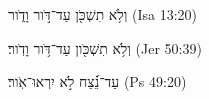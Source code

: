
\begin{exe}

\ex\label{antdur_begintoend_exs21}
\texthebrew{
וְלֹ֥א תִשְׁכֹּ֖ן עַד־דֹּ֣ור וָדֹ֑ור 
} (Isa 13:20)

\ex\label{antdur_begintoend_exs22}
\texthebrew{
וְלֹ֥א תִשְׁכֹּ֖ון עַד־דֹּ֥ור וָדֹֽור׃ 
} (Jer 50:39)

\ex\label{antdur_begintoend_exs23}
\texthebrew{
עַד־נֵ֝֗צַח לֹ֣א יִרְאוּ־אֹֽור׃ 
} (Ps 49:20)

\end{exe}
